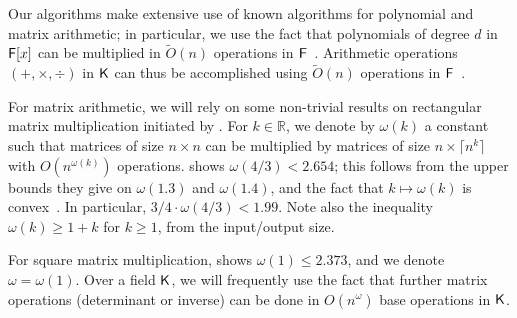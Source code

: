 Our algorithms make extensive use of known algorithms for polynomial and matrix
arithmetic; in particular, we use the fact that polynomials of degree $d$
in ${\mathsf{F}}[x]$ can be multiplied in $\tilde{O}(n)$ operations in
${\mathsf{F}}$~\cite{ScSt71}. Arithmetic operations $(+,\times,\div)$ in ${\mathsf{K}}$ can
thus be accomplished using $\tilde{O}(n)$ operations in
${\mathsf{F}}$~\cite{vzGathen13}.

For matrix arithmetic, we will rely on some non-trivial results on
rectangular matrix multiplication initiated by . For
$k \in \mathbb{R}$, we denote by $\omega(k)$ a constant such that matrices
of size $n\times n$ can be multiplied by matrices of size
$n\times \lceil n^k \rceil$ with $O(n^{\omega(k)})$ operations. 
\cite{LeGall} shows $\omega(4/3) < 2.654$; this follows from the
upper bounds they give on $\omega(1.3)$ and $\omega(1.4)$,
and the fact that $k \mapsto \omega(k)$ is convex~\cite{LoRo83}. In
particular, $3/4 \cdot \omega(4/3) < 1.99$. Note also the inequality
$\omega(k) \ge 1+k$ for $k\ge 1$, from the input/output size.

For square matrix multiplication, \cite{LeGall14} shows
$\omega(1) \le 2.373$, and we denote $\omega=\omega(1)$.  Over a field
${\mathsf{K}}$, we will frequently use the fact that further matrix operations
(determinant or inverse) can be done in $O(n^\omega)$ base operations in
${\mathsf{K}}$.


